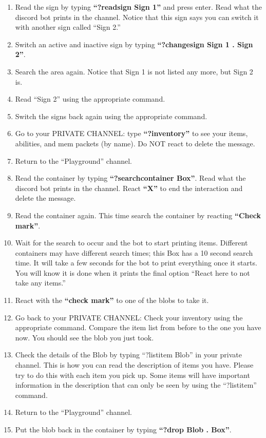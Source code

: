 \documentclass[green]{TMFHope}
\begin{document}
\begin{enumerate}
	\item Read the sign by typing \textbf{``?readsign Sign 1''} and press enter. Read what the discord bot prints in the channel. Notice that this sign says you can switch it with another sign called ``Sign 2.''
	\item Switch an active and inactive sign by typing \textbf{``?changesign Sign 1 . Sign 2''}. 
	\item Search the area again. Notice that Sign 1 is not listed any more, but Sign 2 is.
	\item Read ``Sign 2'' using the appropriate command.
	\item Switch the signs back again using the appropriate command.
	\item Go to your PRIVATE CHANNEL: type \textbf{``?inventory''} to see your items, abilities, and mem packets (by name). Do NOT react to delete the message.
	\item Return to the ``Playground'' channel.
	\item Read the container by typing \textbf{``?searchcontainer Box''}. Read what the discord bot prints in the channel. React \textbf{``X''} to end the interaction and delete the message.
	\item Read the container again. This time search the container by reacting \textbf{``Check mark''}.
	\item Wait for the search to occur and the bot to start printing items. Different containers may have different search times; this Box has a 10 second search time. It will take a few seconds for the bot to print everything once it starts. You will know it is done when it prints the final option ``React here to not take any items.''
	\item React with the \textbf{``check mark''} to one of the blobs to take it.
	\item Go back to your PRIVATE CHANNEL: Check your inventory using the appropriate command. Compare the item list from before to the one you have now. You should see the blob you just took. 
	\item Check the details of the Blob by typing ``?listitem Blob'' in your private channel. This is how you can read the description of items you have. Please try to do this with each item you pick up. Some items will have important information in the description that can only be seen by using the ``?listitem'' command.
	\item Return to the ``Playground'' channel.
	\item Put the blob back in the container by typing \textbf{``?drop Blob . Box''}.

\end{enumerate}
\end{document}
